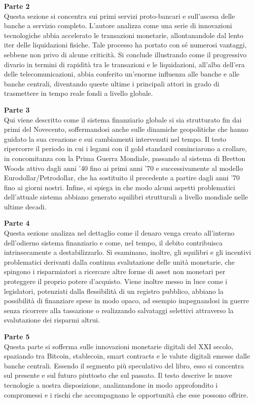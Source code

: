 \documentclass[
  a5paper,
  smalldemyvopaper,10pt,twoside,onecolumn,openright,extrafontsizes,hidelinks]{memoir}
\begin{document}
\textbf{Parte 2}\\
Questa sezione si concentra sui primi servizi proto-bancari e
sull'ascesa delle banche a servizio completo. L'autore analizza come una
serie di innovazioni tecnologiche abbia accelerato le transazioni
monetarie, allontanandole dal lento iter delle liquidazioni fisiche.
Tale processo ha portato con sé numerosi vantaggi, sebbene non privo di
alcune criticità. Si conclude illustrando come il progressivo divario in
termini di rapidità tra le transazioni e le liquidazioni, all'alba
dell'era delle telecomunicazioni, abbia conferito un'enorme influenza
alle banche e alle banche centrali, diventando queste ultime i
principali attori in grado di trasmettere in tempo reale fondi a livello
globale.

\textbf{Parte 3}\\
Qui viene descritto come il sistema finanziario globale si sia
strutturato fin dai primi del Novecento, soffermandosi anche sulle
dinamiche geopolitiche che hanno guidato la sua creazione e sui
cambiamenti intervenuti nel tempo. Il testo ripercorre il periodo in cui
i legami con il gold standard cominciarono a crollare, in concomitanza
con la Prima Guerra Mondiale, passando al sistema di Bretton Woods
attivo dagli anni '40 fino ai primi anni '70 e successivamente al
modello Eurodollar/Petrodollar, che ha sostituito il precedente a
partire dagli anni '70 fino ai giorni nostri. Infine, si spiega in che
modo alcuni aspetti problematici dell'attuale sistema abbiano generato
squilibri strutturali a livello mondiale nelle ultime decadi.

\textbf{Parte 4}\\
Questa sezione analizza nel dettaglio come il denaro venga creato
all'interno dell'odierno sistema finanziario e come, nel tempo, il
debito contribuisca intrinsecamente a destabilizzarlo. Si esaminano,
inoltre, gli squilibri e gli incentivi problematici derivanti dalla
continua svalutazione delle unità monetarie, che spingono i
risparmiatori a ricercare altre forme di asset non monetari per
proteggere il proprio potere d'acquisto. Viene inoltre messo in luce
come i legislatori, potenziati dalla flessibilità di un registro
pubblico, abbiano la possibilità di finanziare spese in modo opaco, ad
esempio impegnandosi in guerre senza ricorrere alla tassazione o
realizzando salvataggi selettivi attraverso la svalutazione dei risparmi
altrui.

\textbf{Parte 5}\\
Questa parte si sofferma sulle innovazioni monetarie digitali del XXI
secolo, spaziando tra Bitcoin, stablecoin, smart contracts e le valute
digitali emesse dalle banche centrali. Essendo il segmento più
speculativo del libro, esso si concentra sul presente e sul futuro
piuttosto che sul passato. Il testo descrive le nuove tecnologie a
nostra disposizione, analizzandone in modo approfondito i compromessi e
i rischi che accompagnano le opportunità che esse possono offrire.
\end{document}
